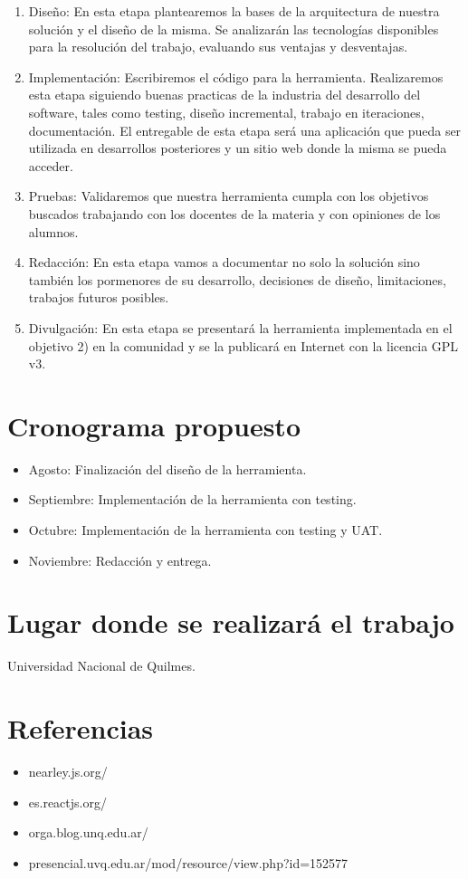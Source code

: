 \documentclass[a4paper,10pt]{article}
\begin{document}
\begin{enumerate}
\item Diseño: En esta etapa plantearemos la bases de la arquitectura de nuestra solución y el diseño de la misma. Se analizarán las tecnologías disponibles para la resolución del trabajo, evaluando sus ventajas y desventajas.
\item Implementación: Escribiremos el código para la herramienta. Realizaremos esta etapa siguiendo buenas practicas de la industria del desarrollo del software, tales como testing, diseño incremental, trabajo en iteraciones, documentación. El entregable de esta etapa será una aplicación que pueda ser utilizada en desarrollos posteriores y un sitio web donde la misma se pueda acceder.
\item Pruebas: Validaremos que nuestra herramienta cumpla con los objetivos buscados trabajando con los docentes de la materia y con opiniones de los alumnos.
\item Redacción: En esta etapa vamos a documentar no solo la solución sino también los pormenores de su desarrollo, decisiones de diseño, limitaciones, trabajos futuros posibles.
\item Divulgación: En esta etapa se presentará la herramienta implementada en el objetivo 2) en la comunidad y se la publicará en Internet con la licencia GPL v3.
\end{enumerate}

\section*{Cronograma propuesto}

\begin{itemize}
	\item Agosto: Finalización del diseño de la herramienta.
	\item Septiembre: Implementación de la herramienta con testing.
	\item Octubre: Implementación de la herramienta con testing y UAT.
	\item Noviembre: Redacción y entrega. 
\end{itemize}

\section*{Lugar donde se realizará el trabajo}
Universidad Nacional de Quilmes.

\section*{Referencias}

\begin{itemize}
	\item nearley.js.org/
	\item es.reactjs.org/
	\item orga.blog.unq.edu.ar/
	\item presencial.uvq.edu.ar/mod/resource/view.php?id=152577
\end{itemize}
\end{document}
